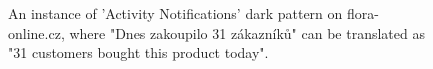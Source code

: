         \begin{figure}[ht]
            \RawFloats
            \centering
            \begin{minipage}[ht]{0.55\linewidth}
                \strut\vspace*{-\baselineskip}\newline
                \centering
                \caption{An instance of 'Activity Notifications' dark pattern on flora-online.cz, where "Dnes zakoupilo 31 zákazníků" can be translated as "31 customers bought this product today".}
                \label{fig:activity-notifications-flora-online}
            \end{minipage}
            \hfill
            \begin{minipage}[ht]{0.40\linewidth}
                \strut\vspace*{-\baselineskip}\newline
                \centering

\end{minipage}
\end{figure}
